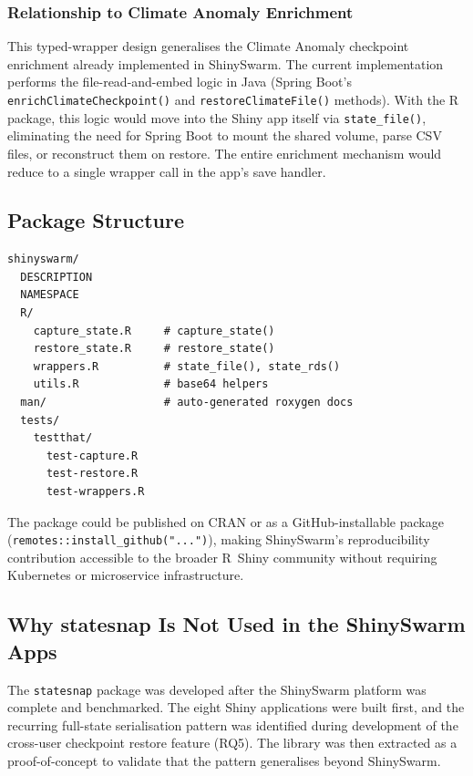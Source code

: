 \documentclass[11pt,a4paper]{article}
\begin{document}
\subsubsection{Relationship to Climate Anomaly Enrichment}

This typed-wrapper design generalises the Climate Anomaly checkpoint enrichment
already implemented in ShinySwarm. The current implementation performs the
file-read-and-embed logic in Java (Spring Boot's \texttt{enrichClimateCheckpoint()}
and \texttt{restoreClimateFile()} methods). With the R package, this logic would
move into the Shiny app itself via \texttt{state\_file()}, eliminating the need
for Spring Boot to mount the shared volume, parse CSV files, or reconstruct
them on restore. The entire enrichment mechanism would reduce to a single
wrapper call in the app's save handler.

\subsection{Package Structure}

\begin{verbatim}
shinyswarm/
  DESCRIPTION
  NAMESPACE
  R/
    capture_state.R     # capture_state()
    restore_state.R     # restore_state()
    wrappers.R          # state_file(), state_rds()
    utils.R             # base64 helpers
  man/                  # auto-generated roxygen docs
  tests/
    testthat/
      test-capture.R
      test-restore.R
      test-wrappers.R
\end{verbatim}

The package could be published on CRAN or as a GitHub-installable package
(\texttt{remotes::install\_github("...")}), making ShinySwarm's reproducibility
contribution accessible to the broader R~Shiny community without requiring
Kubernetes or microservice infrastructure.

\subsection{Why statesnap Is Not Used in the ShinySwarm Apps}

The \texttt{statesnap} package was developed after the ShinySwarm platform was
complete and benchmarked. The eight Shiny applications were built first, and the
recurring full-state serialisation pattern was identified during development of
the cross-user checkpoint restore feature (RQ5). The library was then extracted
as a proof-of-concept to validate that the pattern generalises beyond ShinySwarm.
\end{document}
